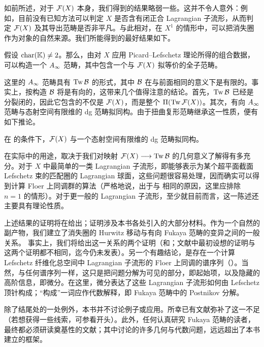 如前所述，对于 $\mathcal F(X)$ 本身，我们得到的结果略弱一些。这并不令人意外：例如，目前没有已知方法可以判定 $X$ 是否含有闭正合 Lagrangian 子流形，从而判定 $\mathcal F(X)$ 及其导出范畴是否非平凡。与此相对，在 $X^1$ 的情形中，可以把消失圈作为对象的自然来源。我们所能得到的最好结果如下。

\begingroup\renewcommand{\theoremname}{定理 B}
\begin{theorem*}\label{st:B}
假设 $\operatorname{char}(\mathbb K)\ne2$。那么，由对 $X$ 应用 Picard–Lefschetz 理论所得的组合数据，可以构造一个 $A_\infty$ 范畴，其中包含一个与 $\mathcal F(X)$ 拟等价的全子范畴。
\end{theorem*}\endgroup

这里的 $A_\infty$ 范畴具有 $\operatorname{Tw}\mathcal B$ 的形式，其中 $\mathcal B$ 在与前面相同的意义下是有限的。事实上，按构造 $\mathcal B$ 将是有向的，这带来几个值得注意的结论。首先，$\operatorname{Tw}\mathcal B$ 已经是分裂闭的，因此它包含的不仅是 $\mathcal F(X)$，而是整个 $\Pi(\operatorname{Tw}\mathcal F(X))$。其次，有向 $A_\infty$ 范畴与态射空间有限维的 dg 范畴拟同构。由于扭曲复形范畴继承这一性质，便有如下推论。

\begingroup\renewcommand{\corollaryname}{推论 C}
\begin{corollary*}\label{st:C}
在 的条件下，$\mathcal F(X)$ 与一个态射空间有限维的 dg 范畴拟同构。
\end{corollary*}\endgroup

 在实际中的用途，取决于我们对映射 $\mathcal F(X)\longrightarrow\operatorname{Tw}\mathcal B$ 的几何意义了解得有多充分。对于 $X$ 中最简单的一类 Lagrangian 子流形，即能够表示为某个超平面截面 Lefschetz 束的匹配圈的 Lagrangian 球面，这些问题很容易处理，因而确实可以得到计算 Floer 上同调群的算法（严格地说，出于与 相同的原因，这里应排除 $n=1$ 的情形）。对于更一般的 Lagrangian 子流形，至少就目前而言，这一陈述还主要具有理论性质。

上述结果的证明将在给出；证明涉及本书各处引入的大部分材料。作为一个自然的副产物，我们建立了消失圈的 Hurwitz 移动与有向 Fukaya 范畴的变异之间的一般关系。
事实上，我们将给出这一关系的两个证明（和；文献中最初设想的证明与这两个证明都不相同，迄今仍未发表）。另一个有趣结论，是存在一个计算 Lefschetz 纤维化总空间中 Lagrangian 子流形的 Floer 上同调的谱序列（）。当然，与任何谱序列一样，这只是把问题分解为可见的部分，即起始项，以及隐藏的高阶信息，即微分。在这里，微分表达了这些 Lagrangian 子流形如何由 Lefschetz 顶针构成；“构成”一词应作代数解释，即 Fukaya 范畴中的 Postnikov 分解。

除了结尾处的一处例外，本书并不讨论例子或应用。所幸已有文献弥补了这一不足（若想获得一些线索，可参看开头）。此外，任何认真研究 Fukaya 范畴的读者，最终都必须研读奠基性的文献；其中讨论的许多几何与代数问题，远远超出了本书建立的框架。

